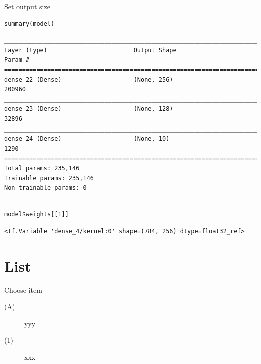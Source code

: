 \documentclass[table]{beamer}
\begin{document}
\begin{frame}[fragile,label={sec:org9744c8c}]{Set output size}
 \lstset{language=r,label= ,caption= ,captionpos=b,numbers=none}
\begin{lstlisting}
summary(model)
\end{lstlisting}


{

\begin{verbatim}
________________________________________________________________________________
Layer (type)                        Output Shape                    Param #     
================================================================================
dense_22 (Dense)                    (None, 256)                     200960      
________________________________________________________________________________
dense_23 (Dense)                    (None, 128)                     32896       
________________________________________________________________________________
dense_24 (Dense)                    (None, 10)                      1290        
================================================================================
Total params: 235,146
Trainable params: 235,146
Non-trainable params: 0
________________________________________________________________________________
\end{verbatim}

}

\lstset{language=r,label= ,caption= ,captionpos=b,numbers=none}
\begin{lstlisting}
model$weights[[1]]
\end{lstlisting}

{

\begin{verbatim}
<tf.Variable 'dense_4/kernel:0' shape=(784, 256) dtype=float32_ref>
\end{verbatim}

}
\end{frame}

\section{List}
\label{sec:org5231a71}

\begin{frame}[label={sec:orga44e0e8}]{Choose item}
\begin{description}
\item[{(A)}] yyy
\item[{(1)}] xxx
\end{description}
\end{frame}
\end{document}
